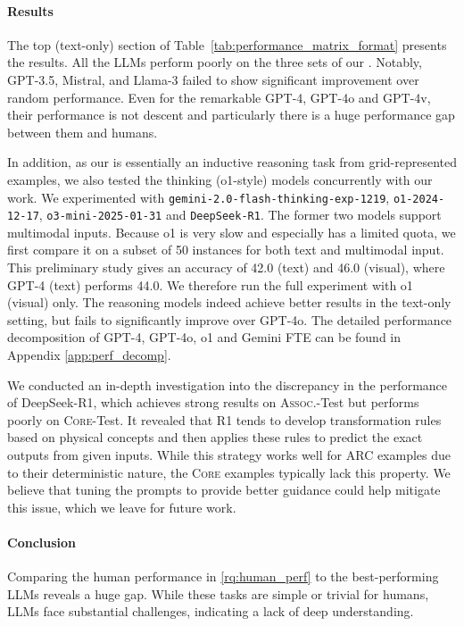 \paragraph{Results}
The top (text-only) section of Table~\ref{tab:performance_matrix_format} presents the results.
All the LLMs perform poorly on the three sets of our \datasetnamens. Notably, GPT-3.5, Mistral, and Llama-3 failed to show significant improvement over random performance.
Even for the remarkable GPT-4, GPT-4o and GPT-4v, their performance is not descent and particularly there is a huge performance gap between them and humans. 

In addition, as our \datasetname is essentially an inductive reasoning task from grid-represented examples, we also tested the thinking (o1-style) models concurrently with our work. We experimented with {\small \texttt{gemini-2.0-flash-thinking-exp-1219}}, {\small \texttt{o1-2024-12-17}}, {\small \texttt{o3-mini-2025-01-31}} and {\small \texttt{DeepSeek-R1}}. The former two models support multimodal inputs.
Because o1 is very slow and especially has a limited quota, we first compare it on a subset of 50 instances for both text and multimodal input. This preliminary study gives an accuracy of 42.0 (text) and 46.0 (visual), where GPT-4 (text) performs {44.0}.
We therefore run the full experiment with o1 (visual) only.
The reasoning models indeed achieve better results in the text-only setting, but fails to significantly improve over GPT-4o. 
The detailed performance decomposition of GPT-4, GPT-4o, o1 and Gemini FTE can be found in Appendix \ref{app:perf_decomp}.

We conducted an in-depth investigation into the discrepancy in the performance of DeepSeek-R1, which achieves strong results on \textsc{Assoc.}-Test but performs poorly on \textsc{Core}-Test. It revealed that R1 tends to develop transformation rules based on physical concepts and then applies these rules to predict the exact outputs from given inputs.
While this strategy works well for ARC examples due to their deterministic nature, the \textsc{Core} examples typically lack this property. We believe that tuning the prompts to provide better guidance could help mitigate this issue, which we leave for future work.


\paragraph{Conclusion}
Comparing the human performance in \ref{rq:human_perf} to the best-performing LLMs reveals a huge gap. 
While these tasks are simple or trivial for humans, LLMs face substantial challenges, indicating a lack of deep understanding.

